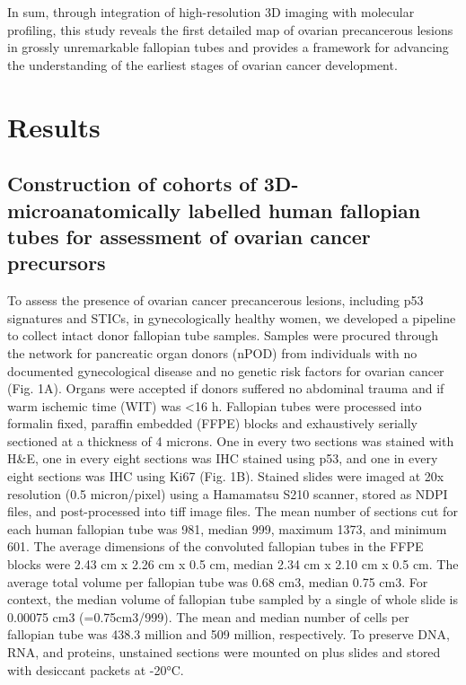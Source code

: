 \begin{refsection}
    In sum, through integration of high-resolution 3D imaging with molecular profiling, this study reveals the first detailed map of ovarian precancerous lesions in grossly unremarkable fallopian tubes and provides a framework for advancing the understanding of the earliest stages of ovarian cancer development.
    
    \section{Results}
    
    \subsection{Construction of cohorts of 3D-microanatomically labelled human fallopian tubes for assessment of ovarian cancer precursors }
    To assess the presence of ovarian cancer precancerous lesions, including p53 signatures and STICs, in gynecologically healthy women, we developed a pipeline to collect intact donor fallopian tube samples. Samples were procured through the network for pancreatic organ donors (nPOD) from individuals with no documented gynecological disease and no genetic risk factors for ovarian cancer (Fig. 1A). Organs were accepted if donors suffered no abdominal trauma and if warm ischemic time (WIT) was <16 h.
    Fallopian tubes were processed into formalin fixed, paraffin embedded (FFPE) blocks and exhaustively serially sectioned at a thickness of 4 microns. One in every two sections was stained with H\&E, one in every eight sections was IHC stained using p53, and one in every eight sections was IHC using Ki67 (Fig. 1B). Stained slides were imaged at 20x resolution (0.5 micron/pixel) using a Hamamatsu S210 scanner, stored as NDPI files, and post-processed into tiff image files. The mean number of sections cut for each human fallopian tube was 981, median 999, maximum 1373, and minimum 601. The average dimensions of the convoluted fallopian tubes in the FFPE blocks were 2.43 cm x 2.26 cm x 0.5 cm, median 2.34 cm x 2.10 cm x 0.5 cm. The average total volume per fallopian tube was 0.68 cm3, median 0.75 cm3. For context, the median volume of fallopian tube sampled by a single of whole slide is 0.00075 cm3 (=0.75cm3/999). The mean and median number of cells per fallopian tube was 438.3 million and 509 million, respectively. To preserve DNA, RNA, and proteins, unstained sections were mounted on plus slides and stored with desiccant packets at -20°C. 

\end{refsection}
